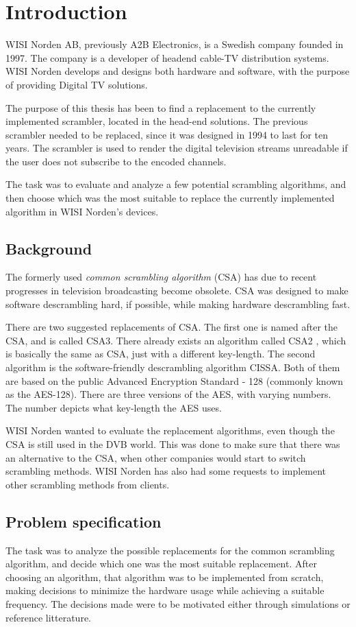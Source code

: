 \chapter{Introduction}
WISI Norden AB, previously A2B Electronics, is a Swedish company 
founded in 1997. The company is a developer of headend cable-TV 
distribution systems. WISI Norden develops and designs both hardware and
software, with the purpose of providing Digital TV solutions. 

The purpose of this thesis has been to find a replacement to the 
currently implemented scrambler, located in the head-end solutions. The 
previous scrambler needed to be replaced, since it was designed in 
1994 to last for ten years. The scrambler is used to render the 
digital television streams unreadable if the user does not subscribe to 
the encoded channels.

The task was to evaluate and analyze a few potential scrambling 
algorithms, and then choose which was the most suitable to replace the 
currently implemented algorithm in WISI Norden's devices.

\section{Background}
The formerly used \emph{common scrambling algorithm} (CSA) has due to 
recent progresses in television broadcasting become obsolete. CSA was 
designed to make software descrambling hard, if possible, while making 
hardware descrambling fast. 

There are two suggested replacements of CSA. The first one is named 
after the CSA, and is called CSA3. There already exists an algorithm 
called CSA2 , which is basically the same as CSA, just with a different 
key-length. The second algorithm is the software-friendly descrambling 
algorithm CISSA. Both of them are based on the public Advanced 
Encryption Standard - 128 (commonly known as the AES-128). There are 
three versions of the AES, with varying numbers. The number depicts 
what key-length the AES uses.

WISI Norden wanted to evaluate the replacement algorithms, even 
though the CSA is still used in the DVB world. This was done to make 
sure that there was an alternative to the CSA, when other companies 
would start to switch scrambling methods. WISI Norden has also had some 
requests to implement other scrambling methods from clients.

\section{Problem specification}
The task was to analyze the possible replacements for the common 
scrambling algorithm, and decide which one was the most suitable 
replacement. After choosing an algorithm, that algorithm was to be 
implemented from scratch, making decisions to minimize the hardware 
usage while achieving a suitable frequency. The decisions made were to 
be motivated either through simulations or reference litterature.

